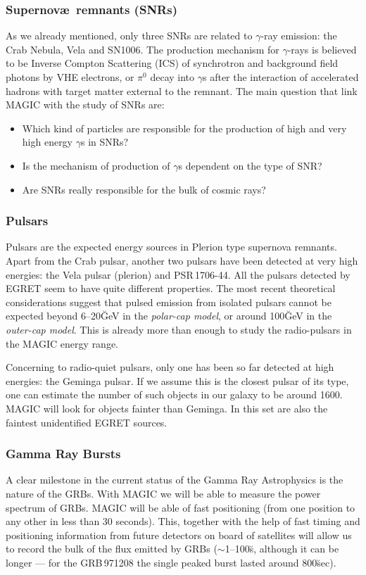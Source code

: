 \subsubsection*{Supernov{\ae}\ remnants (SNRs)}
% 
As  we already mentioned, only  three SNRs are related to $\gamma$-ray
emission: the Crab Nebula,  Vela and SN1006. The  production mechanism
for  $\gamma$-rays is believed to be  Inverse Compton Scattering (ICS)
of synchrotron  and background  field   photons by VHE  electrons,  or
$\pi^0$  decay into  $\gamma$s  after the  interaction of  accelerated
hadrons with target matter external  to the remnant. The main question
that link MAGIC with the study of SNRs are:
%
\begin{itemize}
\item Which  kind of particles  are responsible for  the production of
  high and very high energy $\gamma$s in SNRs?
\item Is  the mechanism  of production  of $\gamma$s dependent  on the
  type of SNR?
\item Are SNRs really responsible for the bulk of cosmic rays?
\end{itemize}

\subsubsection*{Pulsars} 
%
Pulsars are  the  expected energy sources   in  Plerion type supernova
remnants. Apart from the  Crab pulsar, another  two pulsars have  been
detected   at  very high  energies: the    Vela  pulsar  (plerion) and
PSR\,1706-44. All  the pulsars detected  by EGRET  seem to have  quite
different   properties. The   most recent  theoretical  considerations
suggest that pulsed emission from  isolated pulsars cannot be expected
beyond   6--20\u{GeV}  in the    \emph{polar-cap  model},  or   around
100\u{GeV} in  the \emph{outer-cap model}.  This is  already more than
enough to study the radio-pulsars in the MAGIC energy range.

Concerning to radio-quiet pulsars,  only one has  been so far detected
at high energies: the Geminga pulsar. If we assume this is the closest
pulsar of its type, one can estimate the number of such objects in our
galaxy to be  around 1600. MAGIC  will look  for objects  fainter than
Geminga. In this set are also the faintest unidentified EGRET sources.

\subsubsection*{Gamma Ray Bursts} 
%
A clear milestone in the current  status of the Gamma Ray Astrophysics
is the nature of the GRBs. With MAGIC  we will be  able to measure the
power spectrum of GRBs. MAGIC  will be able  of fast positioning (from
one position to  any other  in less than  30 seconds).  This, together
with  the help of fast  timing and positioning information from future
detectors on board of satellites will  allow us to  record the bulk of
the flux emitted by GRBs ($\sim$1--100\u{s}, although it can be longer
---  for   the  GRB\,971208  the single  peaked   burst  lasted around
800\u{sec}).

